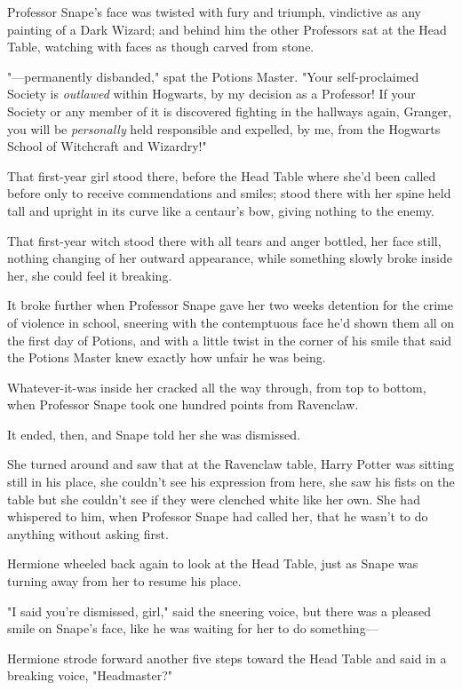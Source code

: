 Professor Snape's face was twisted with fury and triumph, vindictive as any
painting of a Dark Wizard; and behind him the other Professors sat at the Head
Table, watching with faces as though carved from stone.

"---permanently disbanded," spat the Potions Master. "Your self-proclaimed
Society is \emph{outlawed} within Hogwarts, by my decision as a Professor! If
your Society or any member of it is discovered fighting in the hallways again,
Granger, you will be \emph{personally} held responsible and expelled, by me,
from the Hogwarts School of Witchcraft and Wizardry!"

That first-year girl stood there, before the Head Table where she'd been called
before only to receive commendations and smiles; stood there with her spine
held tall and upright in its curve like a centaur's bow, giving nothing to the
enemy.

That first-year witch stood there with all tears and anger bottled, her face
still, nothing changing of her outward appearance, while something slowly broke
inside her, she could feel it breaking.

It broke further when Professor Snape gave her two weeks detention for the
crime of violence in school, sneering with the contemptuous face he'd shown
them all on the first day of Potions, and with a little twist in the corner of
his smile that said the Potions Master knew exactly how unfair he was being.

Whatever-it-was inside her cracked all the way through, from top to bottom,
when Professor Snape took one hundred points from Ravenclaw.

It ended, then, and Snape told her she was dismissed.

She turned around and saw that at the Ravenclaw table, Harry Potter was sitting
still in his place, she couldn't see his expression from here, she saw his
fists on the table but she couldn't see if they were clenched white like her
own. She had whispered to him, when Professor Snape had called her, that he
wasn't to do anything without asking first.

Hermione wheeled back again to look at the Head Table, just as Snape was
turning away from her to resume his place.

"I said you're dismissed, girl," said the sneering voice, but there was a
pleased smile on Snape's face, like he was waiting for her to do something---

Hermione strode forward another five steps toward the Head Table and said in a
breaking voice, "Headmaster?"

